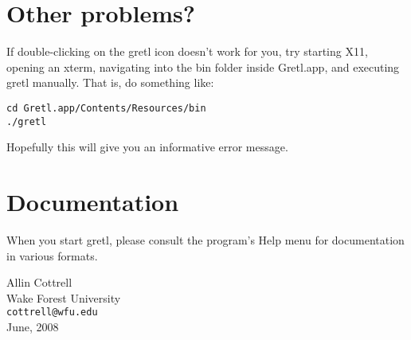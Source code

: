 \documentclass[11pt]{article}
\begin{document}
\section{Other problems?}

If double-clicking on the gretl icon doesn't work for you, try
starting X11, opening an xterm, navigating into the \textsf{bin}
folder inside \textsf{Gretl.app}, and executing \textsf{gretl}
manually.  That is, do something like:

\begin{verbatim}
cd Gretl.app/Contents/Resources/bin
./gretl
\end{verbatim}

Hopefully this will give you an informative error message.

\section{Documentation}
\label{sec:doc}

When you start gretl, please consult the program's Help menu for
documentation in various formats.

\vspace{.25in}

\raggedright
Allin Cottrell \\
Wake Forest University \\
\texttt{cottrell@wfu.edu} \\
June, 2008
\end{document}
